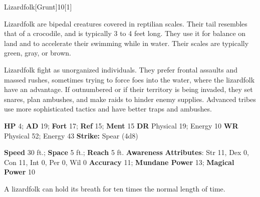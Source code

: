   \begin{monsection}{Lizardfolk}[Grunt]{10}[1]
    \vspace{-1em}\vspace{-1em}
    \vspace{0em}

    
    Lizardfolk are bipedal creatures covered in reptilian scales.
    Their tail resembles that of a crocodile, and is typically 3 to 4 feet long.
    They use it for balance on land and to accelerate their swimming while in water.
    Their scales are typically green, gray, or brown.

    Lizardfolk fight as unorganized individuals.
    They prefer frontal assaults and massed rushes, sometimes trying to force foes into the water, where the lizardfolk have an advantage.
    If outnumbered or if their territory is being invaded, they set snares, plan ambushes, and make raids to hinder enemy supplies.
    Advanced tribes use more sophisticated tactics and have better traps and ambushes.
  

    \begin{spellcontent}
      \begin{spelltargetinginfo}
        \pari \textbf{HP} 4;
          \textbf{AD} 19;
          \textbf{Fort} 17;
          \textbf{Ref} 15;
          \textbf{Ment} 15
        \pari \textbf{DR} Physical 19; Energy 10
        \pari \textbf{WR} Physical 52; Energy 43
        \pari \textbf{Strike:}
            Spear  (4d8)
      \end{spelltargetinginfo}
    \end{spellcontent}
    \begin{monsterfooter}
      \pari \textbf{Speed} 30 ft.;
        \textbf{Space} 5 ft.;
        \textbf{Reach} 5 ft.
      \pari \textbf{Awareness} 
      \pari \textbf{Attributes}:
        Str 11, Dex 0,
        Con 11, Int 0,
        Per 0, Wil 0
      \pari \textbf{Accuracy} 11;
        \textbf{Mundane Power} 13;
      \textbf{Magical Power} 10
    \end{monsterfooter}
  \end{monsection}
   A lizardfolk can hold its breath for ten times the normal length of time.
  
